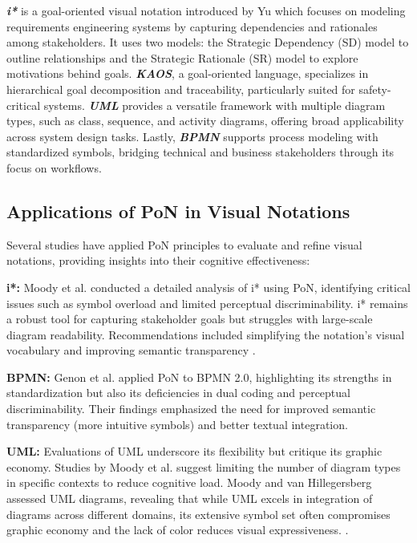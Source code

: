 \documentclass[runningheads]{llncs}
\begin{document}
\textbf{\textit{i*}} is a goal-oriented visual notation introduced by Yu \cite{Yu1997} which focuses on modeling requirements engineering systems by capturing dependencies and rationales among stakeholders. It uses two models: the Strategic Dependency (SD) model to outline relationships and the Strategic Rationale (SR) model to explore motivations behind goals. \textbf{\textit{KAOS}}, a goal-oriented language, specializes in hierarchical goal decomposition and traceability, particularly suited for safety-critical systems. \textbf{\textit{UML}} provides a versatile framework with multiple diagram types, such as class, sequence, and activity diagrams, offering broad applicability across system design tasks. Lastly, \textbf{\textit{BPMN}} supports process modeling with standardized symbols, bridging technical and business stakeholders through its focus on workflows.

\subsection{Applications of PoN in Visual Notations}
Several studies have applied PoN principles to evaluate and refine visual notations, providing insights into their cognitive effectiveness:

\textbf{i*:} Moody et al. \cite{Moody2010} conducted a detailed analysis of i* using PoN, identifying critical issues such as symbol overload and limited perceptual discriminability. i* remains a robust tool for capturing stakeholder goals but struggles with large-scale diagram readability. Recommendations included simplifying the notation’s visual vocabulary and improving semantic transparency \cite{Moody2010}.

\textbf{BPMN:} Genon et al. \cite{Genon2011} applied PoN to BPMN 2.0, highlighting its strengths in standardization but also its deficiencies in dual coding and perceptual discriminability. Their findings emphasized the need for improved semantic transparency (more intuitive symbols) and better textual integration. 

\textbf{UML:} Evaluations of UML underscore its flexibility but critique its graphic economy. Studies by Moody et al.\cite{Moody2008} suggest limiting the number of diagram types in specific contexts to reduce cognitive load. Moody and van Hillegersberg assessed UML diagrams, revealing that while UML excels in integration of diagrams across different domains, its extensive symbol set often compromises graphic economy and the lack of color reduces visual expressiveness. \cite{Moody2008}.
\end{document}
